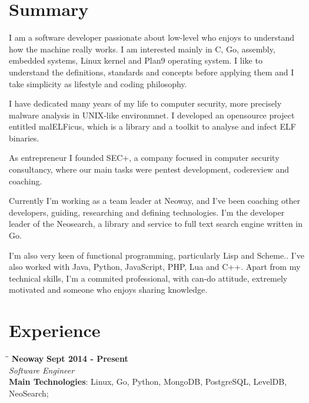 \documentclass[margin]{res}
\begin{document}
  

\address{Florianopolis, SC, Brazil\\ tiago4orion@gmail.com \\ Phone: +55 4891051337 \\ Post Code: 88064-612 }
                           
                        
\begin{resume}                        
 
\section{Summary}  I am a software developer passionate about low-level who enjoys to understand how the machine really works. I am interested mainly in C, Go, assembly, embedded systems, Linux kernel and Plan9 operating system. I like to understand the definitions, standards and concepts before applying them and I take simplicity as lifestyle and coding philosophy.

I have dedicated many years of my life to computer security, more precisely malware analysis in UNIX-like environmnet. I developed an opensource project entitled malELFicus, which is a library and a toolkit to analyse and infect ELF binaries. 

As entrepreneur I founded SEC+, a company focused in computer security consultancy, where our main tasks were pentest development, codereview and coaching.

Currently I'm working as a team leader at Neoway, and I've been coaching other developers, guiding, researching and defining technologies. I'm the developer leader of the Neosearch, a library and service to full text search engine written in Go.

I'm also  very keen of functional programming, particularly Lisp and Scheme.. I've also worked with Java, Python, JavaScript, PHP, Lua and C++. Apart from my technical skills, I'm a commited professional, with can-do attitude, extremely motivated and someone who enjoys sharing knowledge. 

\section{Experience}

\vspace{-0.1in}
   \begin{tabbing}
   \hspace{2.3in}\= \hspace{1.7in}\= \kill %
    \textbf{Neoway}    \>\>\textbf{Sept 2014 - Present}\\
    \textit{Software Engineer}\\        
    \textbf{Main Technologies}: Linux, Go, Python, MongoDB, PostgreSQL, LevelDB, NeoSearch;
   \end{tabbing}\vspace{-20pt}      %
    \vspace{2mm}
  

\end{resume}
\end{document}
